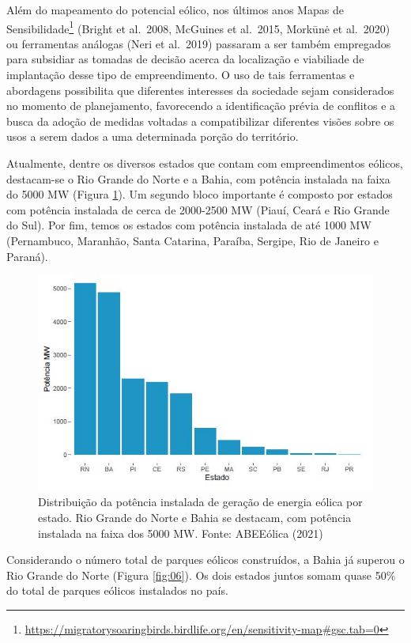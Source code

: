 \documentclass[
  oneside]{scrbook}
\DeclareRobustCommand{\href}[2]{#2\footnote{\url{#1}}}
\begin{document}
Além do mapeamento do potencial eólico, nos últimos anos \href{https://migratorysoaringbirds.birdlife.org/en/sensitivity-map\#gsc.tab=0}{Mapas de Sensibilidade} (Bright et al.~2008, McGuines et al.~2015, Morkūnė et al.~2020) ou ferramentas análogas (Neri et al.~2019) passaram a ser também empregados para subsidiar as tomadas de decisão acerca da localização e viabiliade de implantação desse tipo de empreendimento. O uso de tais ferramentas e abordagens possibilita que diferentes interesses da sociedade sejam considerados no momento de planejamento, favorecendo a identificação prévia de conflitos e a busca da adoção de medidas voltadas a compatibilizar diferentes visões sobre os usos a serem dados a uma determinada porção do território.

Atualmente, dentre os diversos estados que contam com empreendimentos eólicos, destacam-se o Rio Grande do Norte e a Bahia, com potência instalada na faixa do 5000 MW (Figura \ref{fig:05}). Um segundo bloco importante é composto por estados com potência instalada de cerca de 2000-2500 MW (Piauí, Ceará e Rio Grande do Sul). Por fim, temos os estados com potência instalada de até 1000 MW (Pernambuco, Maranhão, Santa Catarina, Paraíba, Sergipe, Rio de Janeiro e Paraná).

\begin{figure}[H]

{\centering \includegraphics[width=0.8\linewidth]{imagens/cap01/Figura_1.5} 

}

\caption{Distribuição da potência instalada de geração de energia eólica por estado. Rio Grande do Norte e Bahia se destacam, com potência instalada na faixa dos 5000 MW. Fonte: ABEEólica (2021)}\label{fig:05}
\end{figure}

Considerando o número total de parques eólicos construídos, a Bahia já superou o Rio Grande do Norte (Figura \ref{fig:06}). Os dois estados juntos somam quase 50\% do total de parques eólicos instalados no país.
\end{document}

